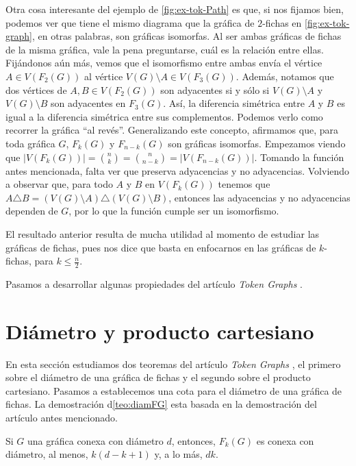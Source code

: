 Otra cosa interesante del ejemplo de \cref{fig:ex-tok-Path} es que, si nos
fijamos bien, podemos ver que tiene el mismo diagrama que la gr\'afica de
$2$-fichas en \cref{fig:ex-tok-graph}, en otras palabras, son gr\'aficas
isomorfas. Al ser ambas gr\'aficas de fichas de la misma gr\'afica, vale la pena
preguntarse, cu\'al es la relaci\'on entre ellas. Fij\'andonos a\'un m\'as,
vemos que el isomorfismo entre ambas env\'ia el v\'ertice $A \in V(F_2(G))$ al
v\'ertice $V(G) \setminus A \in V(F_3(G))$. Adem\'as, notamos que dos v\'ertices
de $ A,B \in V(F_2(G))$ son adyacentes si y s\'olo si $V(G) \setminus A$ y $V(G)
\setminus B$ son adyacentes en $F_3(G)$. As\'i, la diferencia sim\'etrica entre
$A$ y $B$ es igual a la diferencia sim\'etrica entre sus complementos. Podemos
verlo como recorrer la gr\'afica ``al rev\'es''. Generalizando este concepto,
afirmamos que, para toda gr\'afica $G$, $F_k(G)$ y $F_{n-k}(G)$ son gr\'aficas
isomorfas. Empezamos viendo que $|V(F_k(G))| =\binom{n}{k}= \binom{n}{n-k}=
|V(F_{n-k}(G))|$. Tomando la funci\'on antes mencionada, falta ver que preserva
adyacencias y no adyacencias. Volviendo a observar que, para todo $A$ y $B$ en
$V(F_k(G))$ tenemos que $A \triangle B = (V(G)\setminus A) \triangle
(V(G)\setminus B)$, entonces las adyacencias y no adyacencias dependen de $G$,
por lo que la funci\'on cumple ser un isomorfismo. 

El resultado anterior resulta de mucha utilidad al momento de estudiar las
gr\'aficas de fichas, pues nos dice que basta en enfocarnos en las gr\'aficas de
$k$-fichas, para $k \leq \frac{n}{2}$.

Pasamos a desarrollar algunas propiedades del art\'iculo
\textit{Token Graphs} \cite{fabilaToken}.


\section{Di\'ametro y producto cartesiano}%
\label{sec:etiquetas}

En esta secci\'on estudiamos dos teoremas del art\'iculo \textit{Token Graphs}
\cite{fabilaToken}, el primero sobre el di\'ametro de una gr\'afica de fichas y
el segundo sobre el producto cartesiano. Pasamos a establecemos una cota para el
di\'ametro de una gr\'afica de fichas. La demostraci\'on d\cref{teo:diamFG} esta basada
en la demostraci\'on del art\'iculo antes mencionado.

\begin{teorema}%
\label{teo:diamFG}
    Si $G$ una gr\'afica conexa con di\'ametro $d$, entonces, $F_{k}(G)$ es
    conexa con di\'ametro, al menos, $k(d -k+1)$ y, a lo m\'as, $d k$.
\end{teorema}

